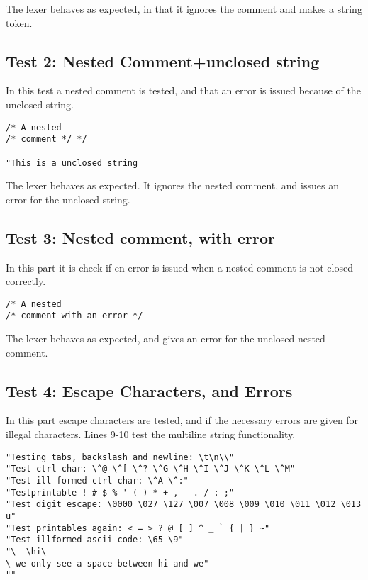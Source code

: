 \documentclass{article}
\begin{document}
The lexer behaves as expected, in that it ignores the comment and makes a string token.

\subsection{Test 2: Nested Comment+unclosed string}
In this test a nested comment is tested, and that an error is issued because of the unclosed string.

\begin{lstlisting}[frame=single]
/* A nested
/* comment */ */

"This is a unclosed string
\end{lstlisting}

The lexer behaves as expected. It ignores the nested comment, and issues an error for the unclosed string.

\subsection{Test 3: Nested comment, with error}
In this part it is check if en error is issued when a nested comment is not closed correctly.

\begin{lstlisting}[frame=single]
/* A nested
/* comment with an error */ 

\end{lstlisting}

The lexer behaves as expected, and gives an error for the unclosed nested comment.

\subsection{Test 4: Escape Characters, and Errors}
In this part escape characters are tested, and if the necessary errors are given for illegal characters.
Lines 9-10 test the multiline string functionality.


\begin{lstlisting}[frame=single]
"Testing tabs, backslash and newline: \t\n\\"
"Test ctrl char: \^@ \^[ \^? \^G \^H \^I \^J \^K \^L \^M"
"Test ill-formed ctrl char: \^A \^:"
"Testprintable ! # $ % ' ( ) * + , - . / : ;"
"Test digit escape: \0000 \027 \127 \007 \008 \009 \010 \011 \012 \013 u"
"Test printables again: < = > ? @ [ ] ^ _ ` { | } ~"
"Test illformed ascii code: \65 \9"
"\	\hi\
\ we only see a space between hi and we"
""
\end{lstlisting}
\end{document}

